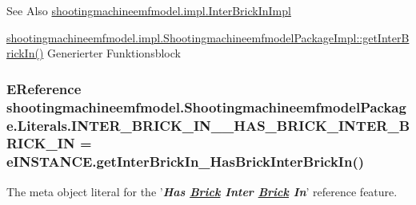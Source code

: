 \begin{DoxySeeAlso}{See Also}
\hyperlink{classshootingmachineemfmodel_1_1impl_1_1_inter_brick_in_impl}{shootingmachineemfmodel.\-impl.\-Inter\-Brick\-In\-Impl} 

\hyperlink{classshootingmachineemfmodel_1_1impl_1_1_shootingmachineemfmodel_package_impl_acc0e584aa945ef34920ace489b75a971}{shootingmachineemfmodel.\-impl.\-Shootingmachineemfmodel\-Package\-Impl\-::get\-Inter\-Brick\-In()} Generierter Funktionsblock 
\end{DoxySeeAlso}
\hypertarget{interfaceshootingmachineemfmodel_1_1_shootingmachineemfmodel_package_1_1_literals_a7ab2471dc236915d8eb7f817ffb4cfde}{
\subsubsection[{I\-N\-T\-E\-R\-\_\-\-B\-R\-I\-C\-K\-\_\-\-I\-N\-\_\-\-\_\-\-H\-A\-S\-\_\-\-B\-R\-I\-C\-K\-\_\-\-I\-N\-T\-E\-R\-\_\-\-B\-R\-I\-C\-K\-\_\-\-I\-N}]{\setlength{\rightskip}{0pt plus 5cm}E\-Reference shootingmachineemfmodel.\-Shootingmachineemfmodel\-Package.\-Literals.\-I\-N\-T\-E\-R\-\_\-\-B\-R\-I\-C\-K\-\_\-\-I\-N\-\_\-\-\_\-\-H\-A\-S\-\_\-\-B\-R\-I\-C\-K\-\_\-\-I\-N\-T\-E\-R\-\_\-\-B\-R\-I\-C\-K\-\_\-\-I\-N = e\-I\-N\-S\-T\-A\-N\-C\-E.\-get\-Inter\-Brick\-In\-\_\-\-Has\-Brick\-Inter\-Brick\-In()}}\label{interfaceshootingmachineemfmodel_1_1_shootingmachineemfmodel_package_1_1_literals_a7ab2471dc236915d8eb7f817ffb4cfde}
The meta object literal for the '{\itshape {\bfseries Has \hyperlink{interfaceshootingmachineemfmodel_1_1_brick}{Brick} Inter \hyperlink{interfaceshootingmachineemfmodel_1_1_brick}{Brick} In}}' reference feature.

